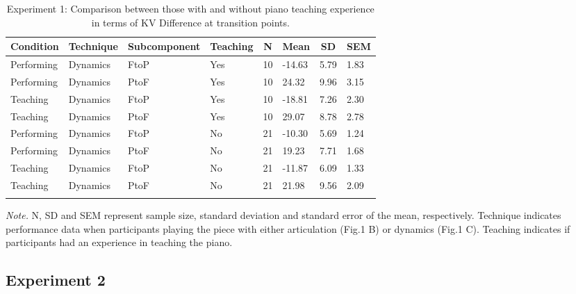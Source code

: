 \documentclass[
  man,floatsintext]{apa6}
\begin{document}
\begin{table}[tbp]

\begin{center}
\begin{threeparttable}

\caption{\label{tab:dyn-diff-teaching-desc-1}Experiment 1: Comparison between those with and without piano teaching experience in terms of KV Difference at transition points.}

\begin{tabular}{llllllll}
\toprule
Condition & \multicolumn{1}{c}{Technique} & \multicolumn{1}{c}{Subcomponent} & \multicolumn{1}{c}{Teaching} & \multicolumn{1}{c}{N} & \multicolumn{1}{c}{Mean} & \multicolumn{1}{c}{SD} & \multicolumn{1}{c}{SEM}\\
\midrule
Performing & Dynamics & FtoP & Yes & 10 & -14.63 & 5.79 & 1.83\\
Performing & Dynamics & PtoF & Yes & 10 & 24.32 & 9.96 & 3.15\\
Teaching & Dynamics & FtoP & Yes & 10 & -18.81 & 7.26 & 2.30\\
Teaching & Dynamics & PtoF & Yes & 10 & 29.07 & 8.78 & 2.78\\
Performing & Dynamics & FtoP & No & 21 & -10.30 & 5.69 & 1.24\\
Performing & Dynamics & PtoF & No & 21 & 19.23 & 7.71 & 1.68\\
Teaching & Dynamics & FtoP & No & 21 & -11.87 & 6.09 & 1.33\\
Teaching & Dynamics & PtoF & No & 21 & 21.98 & 9.56 & 2.09\\
\bottomrule
\addlinespace
\end{tabular}

\begin{tablenotes}[para]
\normalsize{\textit{Note.} N, SD and SEM represent sample size, standard deviation and standard error of the mean, respectively. Technique indicates performance data when participants playing the piece with either articulation (Fig.1 B) or dynamics (Fig.1 C). Teaching indicates if participants had an experience in teaching the piano.}
\end{tablenotes}

\end{threeparttable}
\end{center}

\end{table}

\clearpage

\hypertarget{experiment-2-2}{%
\subsection{Experiment 2}\label{experiment-2-2}}
\end{document}

